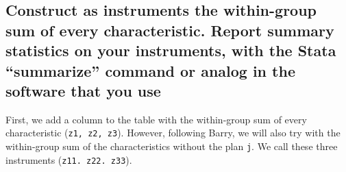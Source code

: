 \documentclass[]{article}
\newenvironment{Shaded}{\begin{snugshade}}{\end{snugshade}}
\newcommand{\DataTypeTok}[1]{\textcolor[rgb]{0.13,0.29,0.53}{#1}}
\newcommand{\KeywordTok}[1]{\textcolor[rgb]{0.13,0.29,0.53}{\textbf{#1}}}
\newcommand{\NormalTok}[1]{#1}
\newcommand{\OperatorTok}[1]{\textcolor[rgb]{0.81,0.36,0.00}{\textbf{#1}}}
\newcommand{\StringTok}[1]{\textcolor[rgb]{0.31,0.60,0.02}{#1}}
\begin{document}
\hypertarget{construct-as-instruments-the-within-group-sum-of-every-characteristic.-report-summary-statistics-on-your-instruments-with-the-stata-summarize-command-or-analog-in-the-software-that-you-use}{%
\subsection{Construct as instruments the within-group sum of every
characteristic. Report summary statistics on your instruments, with the
Stata ``summarize'' command or analog in the software that you
use}\label{construct-as-instruments-the-within-group-sum-of-every-characteristic.-report-summary-statistics-on-your-instruments-with-the-stata-summarize-command-or-analog-in-the-software-that-you-use}}

First, we add a column to the table with the within-group sum of every
characteristic (\texttt{z1,\ z2,\ z3}). However, following Barry, we
will also try with the within-group sum of the characteristics without
the plan \texttt{j}. We call these three instruments
(\texttt{z11.\ z22.\ z33}).

\begin{Shaded}
\end{Shaded}
\end{document}
